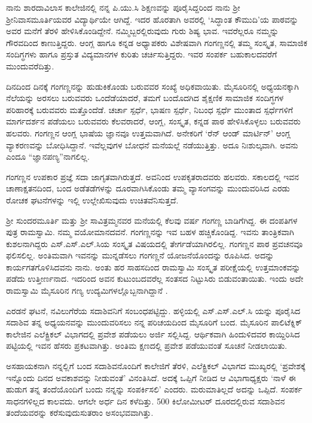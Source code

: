{ನಾನು ಶಾರದಾವಿಲಾಸ ಕಾಲೇಜಿನಲ್ಲಿ ನನ್ನ ಪಿ.ಯು.ಸಿ ಶಿಕ್ಷಣವನ್ನು ಪೂರೈಸಿದ್ದರಿಂದ ನಾನು ಶ್ರೀ ಶ್ರೀನಿವಾಸಮೂರ್ತಿಯವರ ವಿದ್ಯಾರ್ಥಿಯೇ ಆಗಿದ್ದೆ. ಇದರ ಹೊರತಾಗಿ ಅವರಲ್ಲಿ ‘ಸಿದ್ಧಾಂತ ಕೌಮುದಿ’ಯ ಪಾಠವನ್ನು ಅವರ ಮನೆಗೆ ತೆರಳಿ ಹೇಳಿಸಿಕೊಂಡಿದ್ದೇನೆ. ನಮ್ಮಿಬ್ಬರಲ್ಲಿರುವುದು ಗುರು  \enginline{-}  ಶಿಷ್ಯ ಭಾವ. ಇವರೆಲ್ಲರೂ ನಮ್ಮನ್ನು ಗೌರವದಿಂದ ಕಾಣುತ್ತಿದ್ದರು. ಆಂಗ್ಲ ಹಾಗೂ ಕನ್ನಡ ಅಧ್ಯಾಪಕರು ವಿಶೇಷವಾಗಿ ಗಂಗಣ್ಣನಲ್ಲಿ ತಮ್ಮ ಸಂಸ್ಕೃತ, ಸಾಮಾಜಿಕ ಸಂದಿಗ್ಧಗಳು ಹಾಗೂ ಪ್ರಸ್ತುತ ವಿದ್ಯಮಾನಗಳ ಕುರಿತು ಚರ್ಚಿಸುತ್ತಿದ್ದರು. ಇವರ ಸಂಪರ್ಕ ಬಹುಕಾಲದವರೆಗೆ ಮುಂದುವರೆದಿತ್ತು.

ದಿನದಿಂದ ದಿನಕ್ಕೆ ಗಂಗಣ್ಣನನ್ನು ಹುಡುಕಿಕೊಂಡು ಬರುವವರ ಸಂಖ್ಯೆ \hbox{ಅಧಿಕ}\-ವಾಯಿತು. ಮೈಸೂರಿನಲ್ಲಿ ಅಧ್ಯಯನಕ್ಕಾಗಿ ನೆಲೆಯನ್ನು ಅರಸಲು ಬರುವವರು ಒಂದೆಡೆಯಾದರೆ, ತಮಗೆ ಬಂದೊದಗಿದ ಶೈಕ್ಷಣಿಕ  \enginline{-}  ಸಾಮಾಜಿಕ ಸಂದಿಗ್ಧಗಳ \hbox{ಪರಿಹಾರಕ್ಕೆ} ಬರುವವರು ಮತ್ತೊಂದೆಡೆ. ಚರ್ಚಾ ಸ್ಪರ್ಧೆ, ಭಾಷಣ ಸ್ಪರ್ಧೆ, ನಿಬಂಧ ಸ್ಪರ್ಧೆ ಮುಂತಾದ ಸ್ಪರ್ಧೆಗಳಿಗೆ ಮಾರ್ಗದರ್ಶನ ಪಡೆಯಲು ಬರುವವರು ಕೆಲವರಾದರೆ, ಆಂಗ್ಲ, ಸಂಸ್ಕೃತ, ಕನ್ನಡ ಪಾಠ ಹೇಳಿಸಿಕೊಳ್ಳಲು ಬರುವವರು ಹಲವರು. \hbox{ಗಂಗಣ್ಣನ} ಆಂಗ್ಲ ಭಾಷೆಯ ಜ್ಞಾನವೂ ಉತ್ತಮವಾಗಿದೆ. ಅನೇಕರಿಗೆ ‘ರೆನ್ ಆಂಡ್ ಮಾರ್ಟಿನ್’ ಆಂಗ್ಲ ವ್ಯಾಕರಣವನ್ನು ಬೋಧಿಸಿದ್ದಾನೆ. ಇವೆಲ್ಲವುಗಳ ಬೋಧನೆ ಮನೆಯಲ್ಲೆ \hbox{ನಡೆಯುತ್ತಿತ್ತು.} ಅದೂ ನಿಃಶುಲ್ಕವಾಗಿ. ಅವನು ಎಂದೂ “ಜ್ಞಾನಪಣ್ಯ”ನಾಗಲಿಲ್ಲ.

ಗಂಗಣ್ಣನ ಉಪಕಾರ ಪ್ರಜ್ಞೆ ಸದಾ ಜಾಗೃತವಾಗಿರುತ್ತದೆ. ಅವನಿಂದ ಉಪಕೃತರಾದವರು ಹಲವರು. ಸಕಾಲದಲ್ಲಿ ಇವನ ಚಾಣಾಕ್ಷತನದಿಂದ, ಬಂದ ಅಡೆತಡೆಗಳನ್ನು ದೂರವಾಗಿಸಿಕೊಂಡು ತಮ್ಮ ವ್ಯಾಸಂಗವನ್ನು ಮುಂದುವರಿಸಿದ ಎರಡು ರೋಚಕ \hbox{ಘಟನೆಗಳನ್ನು} ಇಲ್ಲಿ ಉಲ್ಲೇಖಿಸುವುದು ಉಚಿತವೆನಿಸುತ್ತದೆ.

ಶ್ರೀ ಸುಂದರಮೂರ್ತಿ ಮತ್ತು ಶ್ರೀ ಸಾವಿತ್ರಮ್ಮನವರ ಮನೆಯಲ್ಲಿ ಕೆಲವು ವರ್ಷ ಗಂಗಣ್ಣ ಬಾಡಿಗೆಗಿದ್ದ. ಈ ದಂಪತಿಗಳ ಪುತ್ರ ರಾಮಸ್ವಾಮಿ. ನಮ್ಮ ವಯೋಮಾನ\-ದವನೆ. ಗಂಗಣ್ಣನನ್ನು ಇವ ಬಹಳ ಹಚ್ಚಿಕೊಂಡಿದ್ದ. ಇವನು ತಾಂತ್ರಿಕವಾಗಿ ಕುಶಲನಾಗಿದ್ದರು ಎಸ್.ಎಸ್.ಎಲ್.ಸಿಯ ಸಂಸ್ಕೃತ ವಿಷಯದಲ್ಲಿ ತೇರ್ಗಡೆಯಾಗಿರಲಿಲ್ಲ. \hbox{ಗಂಗಣ್ಣನ} ಪಾಠ  \enginline{-}  ಪ್ರವಚನವೂ ಫಲಿಸಲಿಲ್ಲ. ಅಂತಿಮವಾಗಿ ಇವನನ್ನು ಮುನ್ನಡೆಸಲು \hbox{ಗಂಗಣ್ಣನೆ} ಯೋಜನೆಯೊಂದನ್ನು ರೂಪಿಸಿದ. ಅದನ್ನು ಕಾರ್ಯಗತಗೊಳಿಸಿದವನು ನಾನು. ಅಂತು ಹರ  \enginline{-}  ಸಾಹಸದಿಂದ ರಾಮಸ್ವಾಮಿ ಸಂಸ್ಕೃತ ಪರೀಕ್ಷೆಯಲ್ಲಿ ಉತ್ತಮಾಂಕವನ್ನು ಪಡೆದು ಉತ್ತೀರ್ಣನಾದ. ಇದರಿಂದ ಅವನ ಕುಟುಂಬದವರೆಲ್ಲ \hbox{ಸಂತಸದ} \hbox{ನಿಟ್ಟುಸಿರು} ಬಿಡುವಂತಾಯಿತು. ಇಂದು ಅದೇ ರಾಮಸ್ವಾಮಿ ಮೈಸೂರಿನ ಗಣ್ಯ ಉದ್ಯಮಿಗಳ\-ಲ್ಲೊಬ್ಬನಾಗಿದ್ದಾನೆ   .

ಎರಡನೆ ಘಟನೆ, ನವಿಲುಗೆರೆಯ ಸದಾಶಿವನಿಗೆ ಸಂಬಂಧಪಟ್ಟಿದ್ದು. ಹಳ್ಳಿಯಲ್ಲಿ ಎಸ್.ಎಸ್.ಎಲ್.ಸಿ ಯನ್ನು ಪೂರೈಸಿದ ಸದಾಶಿವ ತನ್ನ ಅಧ್ಯಯನವನ್ನು ಮುಂದು\-ವರಿಸಲು ನನ್ನ ಪರಿಚಯದಿಂದ ಮೈಸೂರಿಗೆ ಬಂದ. ಮೈಸೂರಿನ ಪಾಲಿಟೆಕ್ನಿಕ್ \hbox{ಕಾಲೇಜಿನ} ಎಲೆಕ್ಟ್ರಿಕಲ್ ವಿಭಾಗದಲ್ಲಿ ಪ್ರವೇಶ ಪಡೆಯಲು ಅರ್ಜಿ ಸಲ್ಲಿಸಿದ್ದ. ಆರ್ಥಿಕವಾಗಿ ಹಿಂದುಳಿ\-ದವರ ಕಾಯ್ದಿರಿಸಿದ  ಪಟ್ಟಿಯಲ್ಲಿ ಇವನ ಹೆಸರು ಪ್ರಕಟ\-ವಾಗಿತ್ತು. ಅಂತಿಮ ಕ್ಷಣದಲ್ಲಿ ಪ್ರವೇಶ ಪಡೆಯುವಂತೆ ಸೂಚನೆ ನೀಡ\-ಲಾಯಿತು.

ಅಸಹಾಯಕನಾಗಿ ನನ್ನಲ್ಲಿಗೆ ಬಂದ ಸದಾಶಿವನೊಂದಿಗೆ ಕಾಲೇಜಿಗೆ ತೆರಳಿ, \hbox{ಎಲೆಕ್ಟ್ರಿಕಲ್} ವಿಭಾಗದ ಮುಖ್ಯರಲ್ಲಿ ‘ಪ್ರವೇಶಕ್ಕೆ ಇನ್ನೊಂದು ದಿನದ ಅವಕಾಶವನ್ನು ನೀಡುವಂತೆ’ ವಿನಂತಿಸಿದೆ. ಅದಕ್ಕೆ ಒಪ್ಪಿಗೆ ನೀಡಿದ ಆ ವಿಭಾಗಾಧ್ಯಕ್ಷರು ‘ನಾಳೆ ಈ ಹುಡುಗ ತನ್ನ ತಂದೆಯೊಂದಿಗೆ ಬಂದು ನನ್ನನ್ನು ಸಂಪರ್ಕಿಸಲಿ’   \enginline{-}   ಎಂದರು. ಮರುಮಾತಿಲ್ಲದೆ ಅದನ್ನು ಒಪ್ಪಿದೆ. ಸಂಪರ್ಕ ಸಾಧನಗಳಿಲ್ಲದ ಕಾಲವದು. ಆಗಲೇ ಅರ್ಧ ದಿನ ಕಳೆದಿತ್ತು. 500 ಕಿಲೋಮೀಟರ್ ದೂರದಲ್ಲಿರುವ ಸದಾಶಿವನ ತಂದೆಯವರನ್ನು ಕರೆಸುವುದು\break ಸುತರಾಂ ಅಸಂಭವವಾಗಿತ್ತು. 

}
